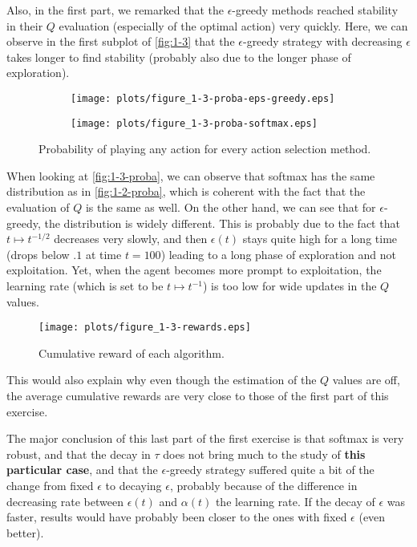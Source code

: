 \documentclass{article}
\begin{document}
Also, in the first part, we remarked that the $\epsilon$-greedy methods reached stability in their $Q$ evaluation (especially of the
optimal action) very quickly. Here, we can observe in the first subplot of \autoref{fig:1-3} that the $\epsilon$-greedy strategy with
decreasing $\epsilon$ takes longer to find stability (probably also due to the longer phase of exploration).

\begin{figure}[!b]
	\begin{subfigure}{.5\textwidth}
		\texttt{[image: plots/figure\_1-3-proba-eps-greedy.eps]}
	\end{subfigure}
	\begin{subfigure}{.5\textwidth}
		\texttt{[image: plots/figure\_1-3-proba-softmax.eps]}
	\end{subfigure}
	\caption{Probability of playing any action for every action selection method.\label{fig:1-3-proba}}
\end{figure}

When looking at \autoref{fig:1-3-proba}, we can observe that softmax has the same distribution as in \autoref{fig:1-2-proba},
which is coherent with the fact that the evaluation of $Q$ is the same as well. On the other hand, we can see that for
$\epsilon$-greedy, the distribution is widely different. This is probably due to the fact that $t \mapsto t^{-1/2}$ decreases
very slowly, and then $\epsilon(t)$ stays quite high for a long time (drops below $.1$ at time $t=100$) leading to a long phase
of exploration and not exploitation. Yet, when the agent becomes more prompt to exploitation, the learning rate (which is set to be
$t \mapsto t^{-1}$) is too low for wide updates in the $Q$ values.

\begin{figure}[!t]
\centering
\texttt{[image: plots/figure\_1-3-rewards.eps]}
\caption{Cumulative reward of each algorithm.\label{fig:3-rewards}}
\end{figure}

This would also explain why even though the estimation of the $Q$ values are off, the average cumulative rewards are very close to those
of the first part of this exercise.

The major conclusion of this last part of the first exercise is that softmax is very robust, and that the decay in $\tau$ does not
bring much to the study of \textbf{this particular case}, and that the $\epsilon$-greedy strategy suffered quite a bit of the change
from fixed $\epsilon$ to decaying $\epsilon$, probably because of the difference in decreasing rate between $\epsilon(t)$ and
$\alpha(t)$ the learning rate. If the decay of $\epsilon$ was faster, results would have probably been closer to the ones with
fixed $\epsilon$ (even better).
\end{document}
